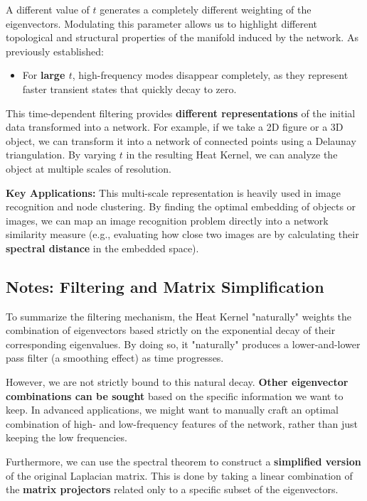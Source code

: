 A different value of \( t \) generates a completely different weighting of the eigenvectors. Modulating this parameter allows us to highlight different topological and structural properties of the manifold induced by the network. As previously established:
\begin{itemize}
    \item For \textbf{large \( t \)}, high-frequency modes disappear completely, as they represent faster transient states that quickly decay to zero.
\end{itemize}

This time-dependent filtering provides \textbf{different representations} of the initial data transformed into a network. For example, if we take a 2D figure or a 3D object, we can transform it into a network of connected points using a Delaunay triangulation. By varying \( t \) in the resulting Heat Kernel, we can analyze the object at multiple scales of resolution.

\textbf{Key Applications:} This multi-scale representation is heavily used in image recognition and node clustering. By finding the optimal embedding of objects or images, we can map an image recognition problem directly into a network similarity measure (e.g., evaluating how close two images are by calculating their \textbf{spectral distance} in the embedded space).

\subsection{Notes: Filtering and Matrix Simplification}
To summarize the filtering mechanism, the Heat Kernel "naturally" weights the combination of eigenvectors based strictly on the exponential decay of their corresponding eigenvalues. By doing so, it "naturally" produces a lower-and-lower pass filter (a smoothing effect) as time progresses.

However, we are not strictly bound to this natural decay. \textbf{Other eigenvector combinations can be sought} based on the specific information we want to keep. In advanced applications, we might want to manually craft an optimal combination of high- and low-frequency features of the network, rather than just keeping the low frequencies.

Furthermore, we can use the spectral theorem to construct a \textbf{simplified version} of the original Laplacian matrix. This is done by taking a linear combination of the \textbf{matrix projectors} related only to a specific subset of the eigenvectors.

